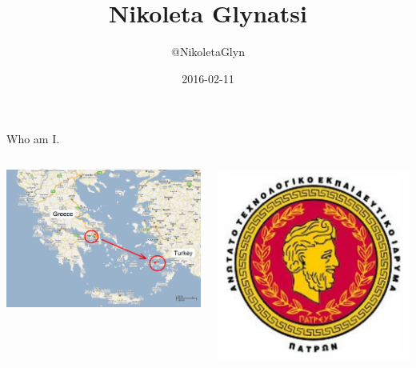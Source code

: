 \documentclass{beamer}
\title{Nikoleta Glynatsi}
\author{@NikoletaGlyn}
\date{2016-02-11}
\begin{document}
\frame{\titlepage}

\begin{frame}{Who am I.}
\begin{columns}[T] %
\begin{column}{.6\textwidth}
  		\includegraphics[width=\textwidth]{static/kos-island-map.png}
\end{column}%
\begin{column}{.2\textwidth}
  		\includegraphics[width=\textwidth]{static/tei-patras-logo.jpg}


\end{column}
\end{columns}
\end{frame}
\end{document}

